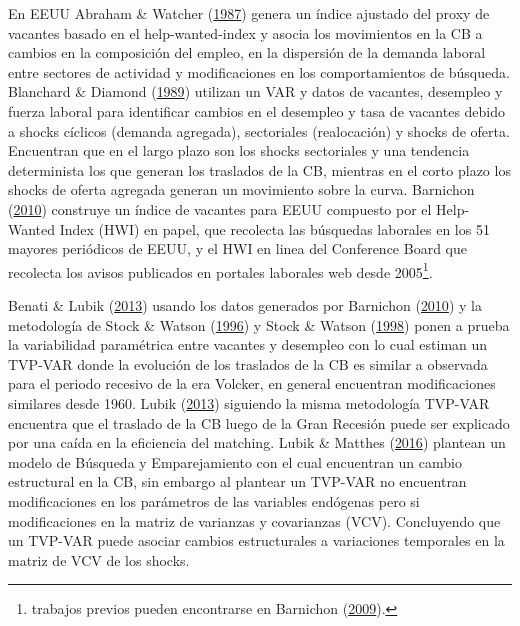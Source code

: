 \documentclass[12pt,oneside]{reedthesis}
\begin{document}
En EEUU Abraham \& Watcher (\protect\hyperlink{ref-Abraham1987}{1987}) genera un índice ajustado del proxy de vacantes basado en el help-wanted-index y asocia los movimientos en la CB a cambios en la composición del empleo, en la dispersión de la demanda laboral entre sectores de actividad y modificaciones en los comportamientos de búsqueda.
Blanchard \& Diamond (\protect\hyperlink{ref-Blanchard1989}{1989}) utilizan un VAR y datos de vacantes, desempleo y fuerza laboral para identificar cambios en el desempleo y tasa de vacantes debido a shocks cíclicos (demanda agregada), sectoriales (realocación) y shocks de oferta. Encuentran que en el largo plazo son los shocks sectoriales y una tendencia determinista los que generan los traslados de la CB, mientras en el corto plazo los shocks de oferta agregada generan un movimiento sobre la curva.
Barnichon (\protect\hyperlink{ref-Barnichon2010}{2010}) construye un índice de vacantes para EEUU compuesto por el Help-Wanted Index (HWI) en papel, que recolecta las búsquedas laborales en los 51 mayores periódicos de EEUU, y el HWI en linea del Conference Board que recolecta los avisos publicados en portales laborales web desde 2005\footnote{trabajos previos pueden encontrarse en Barnichon (\protect\hyperlink{ref-Barnichon2009}{2009}).}.

Benati \& Lubik (\protect\hyperlink{ref-Benati2013}{2013}) usando los datos generados por Barnichon (\protect\hyperlink{ref-Barnichon2010}{2010}) y la metodología de Stock \& Watson (\protect\hyperlink{ref-Stock1996}{1996}) y Stock \& Watson (\protect\hyperlink{ref-Stock1998}{1998}) ponen a prueba la variabilidad paramétrica entre vacantes y desempleo con lo cual estiman un TVP-VAR donde la evolución de los traslados de la CB es similar a observada para el periodo recesivo de la era Volcker, en general encuentran modificaciones similares desde 1960. Lubik (\protect\hyperlink{ref-Lubik2013}{2013}) siguiendo la misma metodología TVP-VAR encuentra que el traslado de la CB luego de la Gran Recesión puede ser explicado por una caída en la eficiencia del matching. Lubik \& Matthes (\protect\hyperlink{ref-Lubik2016}{2016}) plantean un modelo de Búsqueda y Emparejamiento con el cual encuentran un cambio estructural en la CB, sin embargo al plantear un TVP-VAR no encuentran modificaciones en los parámetros de las variables endógenas pero si modificaciones en la matriz de varianzas y covarianzas (VCV). Concluyendo que un TVP-VAR puede asociar cambios estructurales a variaciones temporales en la matriz de VCV de los shocks.
\end{document}
